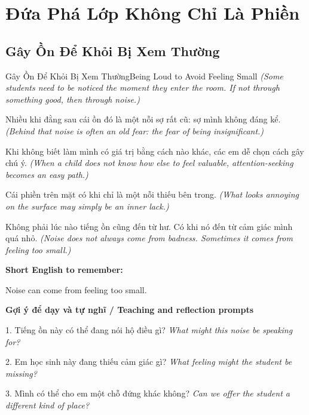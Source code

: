 \chapter{Đứa Phá Lớp Không Chỉ Là Phiền}

\section{Gây Ồn Để Khỏi Bị Xem Thường}
\begin{truyen}{Gây Ồn Để Khỏi Bị Xem Thường}{Being Loud to Avoid Feeling Small}
\textit{(Some students need to be noticed the moment they enter the room. If not through something good, then through noise.)}

Nhiều khi đằng sau cái ồn đó là một nỗi sợ rất cũ: sợ mình không đáng kể.
\textit{(Behind that noise is often an old fear: the fear of being insignificant.)}

Khi không biết làm mình có giá trị bằng cách nào khác, các em dễ chọn cách gây chú ý.
\textit{(When a child does not know how else to feel valuable, attention-seeking becomes an easy path.)}

Cái phiền trên mặt có khi chỉ là một nỗi thiếu bên trong.
\textit{(What looks annoying on the surface may simply be an inner lack.)}

\end{truyen}

\begin{baihoc}
Không phải lúc nào tiếng ồn cũng đến từ hư. Có khi nó đến từ cảm giác mình quá nhỏ.
\textit{(Noise does not always come from badness. Sometimes it comes from feeling too small.)}
\end{baihoc}

\begin{ghinhoanh}
\textbf{Short English to remember:}

Noise can come from feeling too small.

\end{ghinhoanh}

\begin{tuhocnhanh}
\textbf{Gợi ý để dạy và tự nghĩ / Teaching and reflection prompts}

1. Tiếng ồn này có thể đang nói hộ điều gì? \textit{What might this noise be speaking for?}

2. Em học sinh này đang thiếu cảm giác gì? \textit{What feeling might the student be missing?}

3. Mình có thể cho em một chỗ đứng khác không? \textit{Can we offer the student a different kind of place?}
\end{tuhocnhanh}
\ngancach

